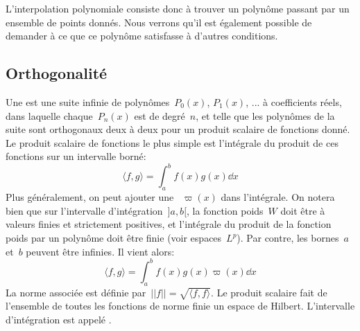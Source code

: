 L'interpolation polynomiale consiste donc à trouver un polynôme passant par un ensemble de points donnés. Nous verrons qu'il est également possible de demander à ce que ce polynôme satisfasse à d'autres conditions.
 
\subsection{Orthogonalité} 
Une  est une suite infinie de polynômes~$P_0(x)$, $P_1(x)$, ... à coefficients réels, dans laquelle chaque~$P_n(x)$ est de degré~$n$, et telle que les polynômes de la suite sont orthogonaux deux à deux pour un produit scalaire de fonctions donné. Le produit scalaire de fonctions le plus simple est l'intégrale du produit de ces fonctions sur un intervalle borné: 
\begin{equation}
\langle f,g \rangle=\int_a^b f(x)g(x)\dd x 
\end{equation}
Plus généralement, on peut ajouter une ~$\varpi(x)$ dans l'intégrale. On notera bien que sur l'intervalle d'intégration~$]a,b[$, la fonction poids~$W$ doit être à valeurs finies et strictement positives, et l'intégrale du produit de la fonction poids par un polynôme doit être finie (voir espaces~$L^p$). Par contre, les bornes~$a$ et~$b$ peuvent être infinies. Il vient alors: 
\begin{equation}
 \langle f,g \rangle=\int_a^b f(x)g(x)\varpi(x)\dd x 
\end{equation}
La norme associée est définie par~$||f||=\sqrt{\langle f,f \rangle}$. Le produit scalaire fait de l'ensemble de toutes les fonctions de norme finie un espace de Hilbert. L'intervalle d'intégration est appelé . 
